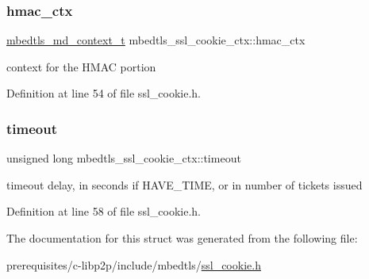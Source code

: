 \subsubsection{\texorpdfstring{hmac\+\_\+ctx}{hmac\_ctx}}
{\footnotesize\ttfamily \mbox{\hyperlink{structmbedtls__md__context__t}{mbedtls\+\_\+md\+\_\+context\+\_\+t}} mbedtls\+\_\+ssl\+\_\+cookie\+\_\+ctx\+::hmac\+\_\+ctx}

context for the H\+M\+AC portion 

Definition at line 54 of file ssl\+\_\+cookie.\+h.

\mbox{\label{structmbedtls__ssl__cookie__ctx_adf87598d619f8fcf161965301c423ffb}} 
\subsubsection{\texorpdfstring{timeout}{timeout}}
{\footnotesize\ttfamily unsigned long mbedtls\+\_\+ssl\+\_\+cookie\+\_\+ctx\+::timeout}

timeout delay, in seconds if H\+A\+V\+E\+\_\+\+T\+I\+ME, or in number of tickets issued 

Definition at line 58 of file ssl\+\_\+cookie.\+h.



The documentation for this struct was generated from the following file\+:\begin{DoxyCompactItemize}
\item 
prerequisites/c-\/libp2p/include/mbedtls/\mbox{\hyperlink{ssl__cookie_8h}{ssl\+\_\+cookie.\+h}}\end{DoxyCompactItemize}
